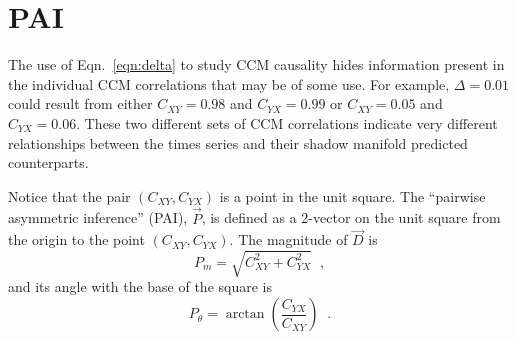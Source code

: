 \documentclass[a4paper,11pt]{article}
\begin{document}
\section{PAI}
The use of Eqn.\ \ref{eqn:delta} to study CCM causality hides information present in the individual CCM correlations that may be of some use.  For example, $\Delta = 0.01$ could result from either $C_{XY} = 0.98$ and $C_{YX} = 0.99$ or $C_{XY} = 0.05$ and $C_{YX} = 0.06$.  These two different sets of CCM correlations indicate very different relationships between the times series and their shadow manifold predicted counterparts.  

Notice that the pair $\left(C_{XY},C_{YX}\right)$ is a point in the unit square.  The ``pairwise asymmetric inference'' (PAI), $\vec{P}$, is defined as a 2-vector on the unit square from the origin to the point $\left(C_{XY},C_{YX}\right)$.  The magnitude of $\vec{D}$ is 
\begin{equation}
P_m = \sqrt{C_{XY}^2+C_{YX}^2}\;\;,
\end{equation}
and its angle with the base of the square is
\begin{equation}
P_\theta = \arctan\left(\frac{C_{YX}}{C_{XY}}\right)\;\;.
\end{equation}
\end{document}
